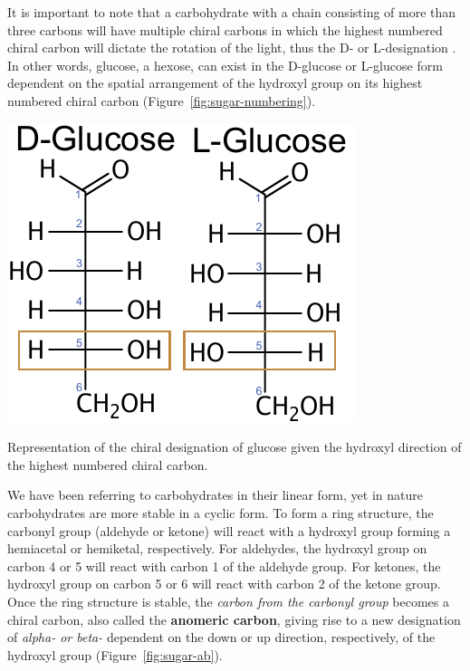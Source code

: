 \documentclass{tufte-handout}
\begin{document}
It is important to note that a carbohydrate with a chain consisting of more than three carbons will have multiple chiral carbons in which the highest numbered chiral carbon will dictate the rotation of the light, thus the D- or L-designation . In other words, glucose, a hexose, can exist in the D-glucose or L-glucose form dependent on the spatial arrangement of the hydroxyl group on its highest numbered chiral carbon (Figure~\ref{fig:sugar-numbering}).

\begin{marginfigure}
\includegraphics{figures/Glucose-DL.pdf}
\caption{Representation of the chiral designation of glucose given the hydroxyl direction of the highest numbered chiral carbon.}\label{fig:sugar-numbering}
\end{marginfigure}

 We have been referring to carbohydrates in their linear form, yet in nature carbohydrates are more stable in a cyclic form. To form a ring structure, the carbonyl group (aldehyde or ketone) will react with a hydroxyl group forming a hemiacetal or hemiketal, respectively. For aldehydes, the hydroxyl group on carbon 4 or 5 will react with carbon 1 of the aldehyde group. For ketones, the hydroxyl group on carbon 5 or 6 will react with carbon 2 of the ketone group. Once the ring structure is stable, the \emph{carbon from the carbonyl group} becomes a chiral
carbon, also called the \textbf{anomeric carbon}, giving rise to a new designation of \emph{alpha- or beta-} dependent on the down or up direction, respectively, of the hydroxyl group (Figure~\ref{fig:sugar-ab}).
\end{document}
